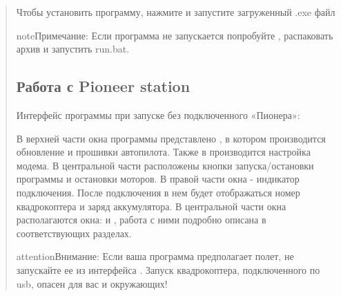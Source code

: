 \documentclass[a4paper,10pt,russian]{sphinxmanual}
\begin{document}
\begin{quote}
\begin{itemize}
\end{itemize}

Чтобы установить программу, нажмите  и запустите загруженный .exe файл

\begin{sphinxadmonition}{note}{Примечание:}
Если программа не запускается попробуйте , распаковать архив и запустить run.bat.
\end{sphinxadmonition}


\subsection{Работа с Pioneer station}
\label{\detokenize{programming/pioneer_station/pioneer_station_work:pioneer-station}}\label{\detokenize{programming/pioneer_station/pioneer_station_work::doc}}
Интерфейс программы при запуске без подключенного «Пионера»:


В верхней части окна программы представлено , в котором производится обновление  и прошивки автопилота.
Также в  производится настройка модема. В центральной части расположены кнопки запуска/остановки программы и остановки моторов.
В правой части окна - индикатор подключения. После подключения в нем будет отображаться номер квадрокоптера и заряд аккумулятора.
В центральной части окна располагаются окна: {\hyperref[\detokenize{programming/pioneer_station/pioneer_station_code_editor::doc}]{}} и {\hyperref[\detokenize{settings/autopilot_parameters::doc}]{}}, работа с ними подробно описана в соответствующих разделах.

\begin{sphinxadmonition}{attention}{Внимание:}
Если ваша программа предполагает полет, не запускайте ее из интерфейса . Запуск квадрокоптера, подключенного по usb, опасен для вас и окружающих!
\end{sphinxadmonition}



\end{quote}
\end{document}
